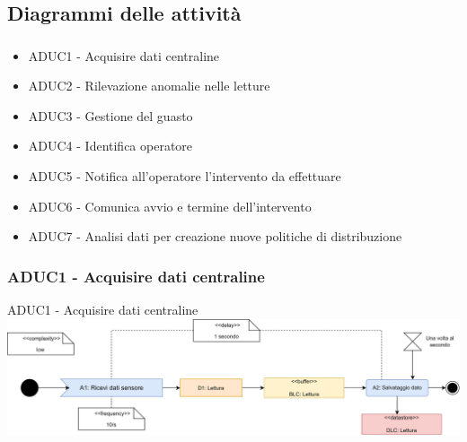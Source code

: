 \documentclass{beamer}
\begin{document}
	\subsection{Diagrammi delle attività}\label{activity_diagram}
		\begin{frame}	
		\frametitle{}
		\begin{block}{}
			\begin{itemize}
				\item ADUC1 - Acquisire dati centraline
				\item ADUC2 - Rilevazione anomalie nelle letture
				\item ADUC3 - Gestione del guasto
				\item ADUC4 - Identifica operatore
				\item ADUC5 - Notifica all'operatore l'intervento da effettuare
				\item ADUC6 - Comunica avvio e termine dell'intervento
				\item ADUC7 - Analisi dati per creazione nuove politiche di distribuzione
			\end{itemize}
		\end{block}
		\end{frame}
		
		\begin{frame}
	    \subsubsection{ADUC1 - Acquisire dati centraline}	 
		\begin{block}{ADUC1 - Acquisire dati centraline}
			\includegraphics[width=\textwidth, height=0.85\textheight, keepaspectratio=true]{ADUC1.png}
		\end{block}
		\end{frame}
\end{document}
